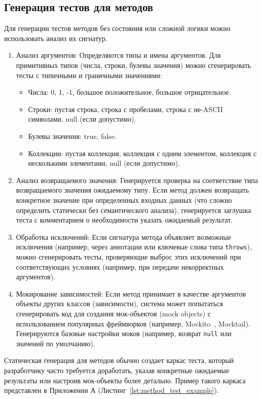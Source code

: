 \documentclass[14pt, russian]{scrartcl}
\begin{document}
\subsection{Генерация тестов для методов}

Для генерации тестов методов без состояния или сложной логики можно использовать анализ их сигнатур.

\begin{enumerate}
    \item {Анализ аргументов:} Определяются типы и имена аргументов. Для примитивных типов (числа, строки, булевы значения) можно сгенерировать тесты с типичными и граничными значениями:
        \begin{itemize}
            \item Числа: 0, 1, -1, большое положительное, большое отрицательное.
            \item Строки: пустая строка, строка с пробелами, строка с не-ASCII символами, null (если допустимо).
            \item Булевы значения: true, false.
            \item Коллекции: пустая коллекция, коллекция с одним элементом, коллекция с несколькими элементами, null (если допустимо).
        \end{itemize}
    \item {Анализ возвращаемого значения:} Генерируется проверка на соответствие типа возвращаемого значения ожидаемому типу. Если метод должен возвращать конкретное значение при определенных входных данных (что сложно определить статически без семантического анализа), генерируется заглушка теста с комментарием о необходимости указать ожидаемый результат.
    \item {Обработка исключений:} Если сигнатура метода объявляет возможные исключения (например, через аннотации или ключевые слова типа \texttt{throws}), можно сгенерировать тесты, проверяющие выброс этих исключений при соответствующих условиях (например, при передаче некорректных аргументов).
    \item {Мокирование зависимостей:} Если метод принимает в качестве аргументов объекты других классов (зависимости), система может попытаться сгенерировать код для создания мок-объектов (mock objects) с использованием популярных фреймворков (например, Mockito~\cite{MockitoDart}, Mocktail). Генерируются базовые настройки моков (например, возврат \texttt{null} или значений по умолчанию).
\end{enumerate}

Статическая генерация для методов обычно создает каркас теста, который разработчику часто требуется доработать, указав конкретные ожидаемые результаты или настроив мок-объекты более детально. Пример такого каркаса представлен в Приложении А (Листинг~\ref{lst:method_test_example}).
\end{document}
